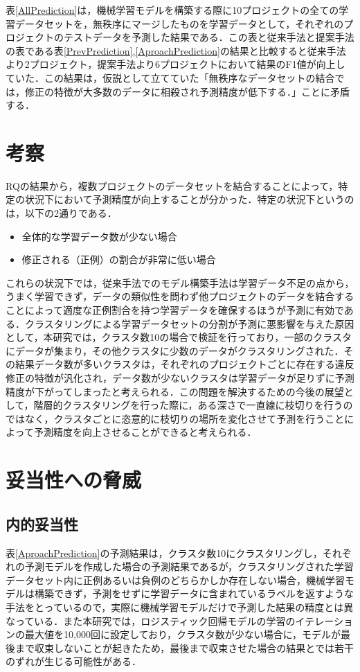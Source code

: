 \documentclass[T,J]{fose} %
\begin{document}
表\ref{AllPrediction}は，機械学習モデルを構築する際に10プロジェクトの全ての学習データセットを，無秩序にマージしたものを学習データとして，それぞれのプロジェクトのテストデータを予測した結果である．この表と従来手法と提案手法の表である表\ref{PrevPrediction},\ref{AproachPrediction}の結果と比較すると従来手法より2プロジェクト，提案手法より6プロジェクトにおいて結果のF1値が向上していた．この結果は，仮説として立てていた「無秩序なデータセットの結合では，修正の特徴が大多数のデータに相殺され予測精度が低下する．」ことに矛盾する．


\section{考察}\label{sec:consideration}
RQの結果から，複数プロジェクトのデータセットを結合することによって，特定の状況下において予測精度が向上することが分かった．特定の状況下というのは，以下の2通りである．

\begin{itemize}
    \item 全体的な学習データ数が少ない場合
    \item 修正される（正例）の割合が非常に低い場合
\end{itemize}

これらの状況下では，従来手法でのモデル構築手法は学習データ不足の点から，うまく学習できず，データの類似性を問わず他プロジェクトのデータを結合することによって適度な正例割合を持つ学習データを確保するほうが予測に有効である．クラスタリングによる学習データセットの分割が予測に悪影響を与えた原因として，本研究では，クラスタ数10の場合で検証を行っており，一部のクラスタにデータが集まり，その他クラスタに少数のデータがクラスタリングされた．その結果データ数が多いクラスタは，それぞれのプロジェクトごとに存在する違反修正の特徴が汎化され，データ数が少ないクラスタは学習データが足りずに予測精度が下がってしまったと考えられる．この問題を解決するための今後の展望として，階層的クラスタリングを行った際に，ある深さで一直線に枝切りを行うのではなく，クラスタごとに恣意的に枝切りの場所を変化させて予測を行うことによって予測精度を向上させることができると考えられる．


\section{妥当性への脅威}\label{sec:heuristic}
\subsection{内的妥当性}
表\ref{AproachPrediction}の予測結果は，クラスタ数10にクラスタリングし，それぞれの予測モデルを作成した場合の予測結果であるが，クラスタリングされた学習データセット内に正例あるいは負例のどちらかしか存在しない場合，機械学習モデルは構築できず，予測をせずに学習データに含まれているラベルを返すような手法をとっているので，実際に機械学習モデルだけで予測した結果の精度とは異なっている．また本研究では，ロジスティック回帰モデルの学習のイテレーションの最大値を10,000回に設定しており，クラスタ数が少ない場合に，モデルが最後まで収束しないことが起きたため，最後まで収束させた場合の結果とでは若干のずれが生じる可能性がある．
\end{document}
